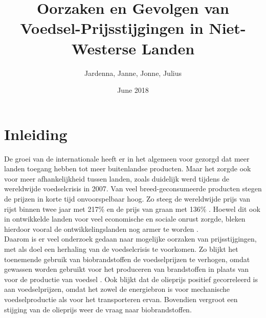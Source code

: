 \documentclass{article}
\title{Oorzaken en Gevolgen van Voedsel-Prijsstijgingen in Niet-Westerse Landen}
\author{Jardenna, Janne, Jonne, Julius}
\date{June 2018}
\begin{document}
\maketitle

\section*{Inleiding}

De groei van de internationale heeft er in het algemeen voor gezorgd dat meer landen toegang hebben tot meer buitenlandse producten. Maar het zorgde ook voor meer afhankelijkheid tussen landen, zoals duidelijk werd tijdens de wereldwijde voedselcrisis in 2007. Van veel breed-geconsumeerde producten stegen de prijzen in korte tijd onvoorspelbaar hoog. Zo steeg de wereldwijde prijs van rijst binnen twee jaar met  217\% en de prijs van graan met 136\% \cite{steinberg2008financial}. Hoewel dit ook in ontwikkelde landen voor veel economische en sociale onrust zorgde, bleken hierdoor vooral de ontwikkelingslanden nog armer te worden \cite{ivanic2008implications}. \\

Daarom is er veel onderzoek gedaan naar mogelijke oorzaken van prijsstijgingen, met als doel een herhaling van de voedselcrisis te voorkomen. Zo blijkt het toenemende gebruik van biobrandstoffen de voedselprijzen te verhogen, omdat gewassen worden gebruikt voor het produceren van brandstoffen in plaats van voor de productie van voedsel \cite{mitchell2008note}.
Ook blijkt dat de olieprijs positief gecorreleerd is aan voedselprijzen, omdat het zowel de energiebron is voor mechanische voedselproductie als voor het transporteren ervan\cite{zubrin2008food}. Bovendien vergroot een stijging van de olieprijs weer de vraag naar biobrandstoffen.\\

\end{document}
